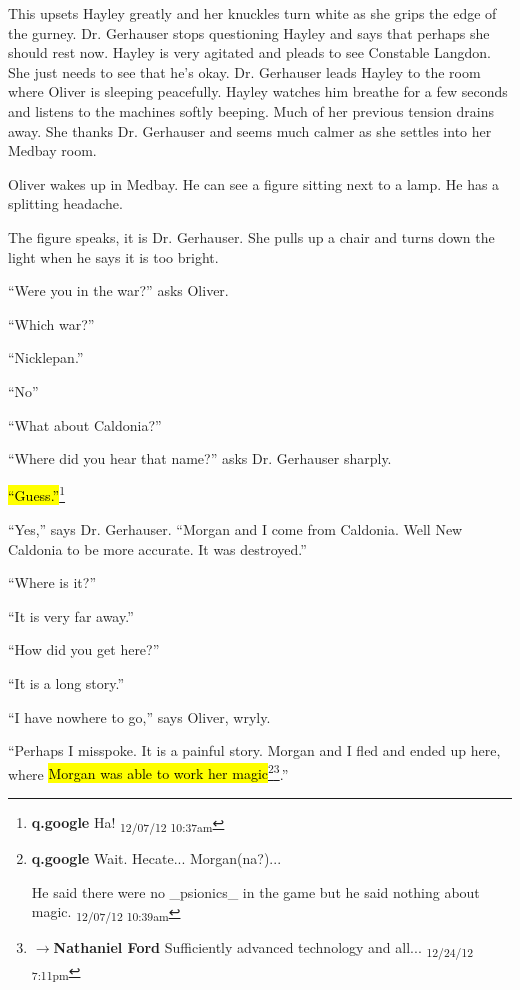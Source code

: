 This upsets Hayley greatly and her knuckles turn white as she grips the edge of the gurney.  Dr. Gerhauser stops questioning Hayley and says that perhaps she should rest now.  Hayley is very agitated and pleads to see Constable Langdon.  She just needs to see that he's okay.  Dr. Gerhauser leads Hayley to the room where Oliver is sleeping peacefully.  Hayley watches him breathe for a few seconds and listens to the machines softly beeping.  Much of her previous tension drains away.  She thanks Dr. Gerhauser and seems much calmer as she settles into her Medbay room. 



Oliver wakes up in Medbay.  He can see a figure sitting next to a lamp.  He has a splitting headache.



The figure speaks, it is Dr. Gerhauser.  She pulls up a chair and turns down the light when he says it is too bright.  



``Were you in the war?'' asks Oliver.

``Which war?''

``Nicklepan.''

``No''

``What about Caldonia?''

``Where did you hear that name?'' asks Dr. Gerhauser sharply.

\hl{``Guess.''}\footnote{\textbf{q.google }Ha! \textsubscript{12/07/12 10:37am}}

``Yes,'' says Dr. Gerhauser.  ``Morgan and I come from Caldonia.  Well New Caldonia to be more accurate.  It was destroyed.''

``Where is it?''

``It is very far away.''

``How did you get here?''

``It is a long story.''

``I have nowhere to go,'' says Oliver, wryly.

``Perhaps I misspoke.  It is a painful story.  Morgan and I fled and ended up here, where \hl{Morgan was able to work her magic}\footnote{\textbf{q.google }Wait.  Hecate... Morgan(na?)... 

He said there were no \_psionics\_ in the game but he said nothing about magic. \textsubscript{12/07/12 10:39am}}\footnote{$\rightarrow$\textbf{Nathaniel Ford }Sufficiently advanced technology and all... \textsubscript{12/24/12 7:11pm}}.''

